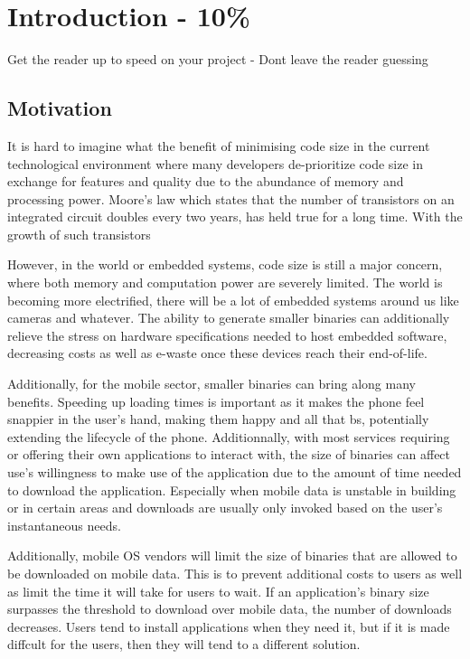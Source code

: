 \chapter{Introduction - 10\%}
\label{cha:intro}

Get the reader up to speed on your project - Dont leave the reader guessing
\section{Motivation}
It is hard to imagine what the benefit of minimising code size in the current technological environment where many developers de-prioritize code size in exchange for features and quality due to the abundance of memory and processing power. Moore's law which states that the number of transistors on an integrated circuit doubles every two years, has held true for a long time. With the growth of such transistors

However, in the world or embedded systems, code size is still a major concern, where both memory and computation power are severely limited. The world is becoming more electrified, there will be a lot of embedded systems around us like cameras and whatever. The ability to generate smaller binaries can additionally relieve the stress on hardware specifications needed to host embedded software, decreasing costs as well as e-waste once these devices reach their end-of-life.

Additionally, for the mobile sector, smaller binaries can bring along many benefits. Speeding up loading times is important as it makes the phone feel snappier in the user's hand, making them happy and all that bs, potentially extending the lifecycle of the phone. Additionnally, with most services requiring or offering their own applications to interact with, the size of binaries can affect use's willingness to make use of the application due to the amount of time needed to download the application. Especially when mobile data is unstable in building or in certain areas and downloads are usually only invoked based on the user's instantaneous needs.

Additionally, mobile OS vendors will limit the size of binaries that are allowed to be downloaded on mobile data. This is to prevent additional costs to users as well as limit the time it will take for users to wait. If an application's binary size surpasses the threshold to download over mobile data, the number of downloads decreases. Users tend to install applications when they need it, but if it is made diffcult for the users, then they will tend to a different solution. \cite{UberBinarySize}

